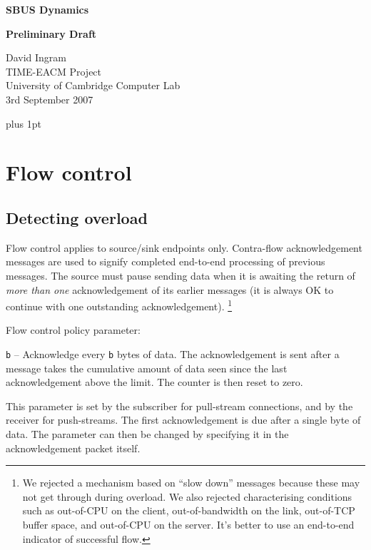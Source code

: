 \documentclass[12pt,a4paper,twoside]{article}
\renewcommand{\_}{\texttt{\symbol{95}}}
\begin{document}
\centerline{\textbf{\LARGE SBUS Dynamics}}
\vspace{3mm}
\centerline{\textbf{\LARGE Preliminary Draft}}
\begin{center} \large
David Ingram\\
TIME-EACM Project\\
University of Cambridge Computer Lab\\
3rd September 2007\\
\end{center}

{ \parskip 1mm plus 1pt \tableofcontents }
\pagestyle{fancy}

\vspace{10mm}

\section{Flow control}

\subsection{Detecting overload}

Flow control applies to source/sink endpoints only.
Contra-flow acknowledgement messages are used to signify completed
end-to-end processing of previous messages. The source must pause
sending data when it is awaiting the return of \textit{more than one}
acknowledgement of its earlier messages (it is always OK to continue
with one outstanding acknowledgement).%
\footnote{We rejected a mechanism based on ``slow down'' messages
because these may not get through during overload. We also rejected
characterising conditions such as out-of-CPU on the client,
out-of-bandwidth on the link, out-of-TCP buffer space, and out-of-CPU
on the server.
It's better to use an end-to-end indicator of successful flow.}

Flow control policy parameter:
\begin{bulletlist}
\item \texttt{b} -- Acknowledge every \texttt{b} bytes of data.
   The acknowledgement is sent after a message takes the cumulative
   amount of data seen since the last acknowledgement above the limit.
   The counter is then reset to zero.
\end{bulletlist}

This parameter is set by the subscriber for pull-stream connections,
and by the receiver for push-streams. The first acknowledgement is due
after a single byte of data. The parameter can then be changed
by specifying it in the acknowledgement packet itself.
\end{document}
